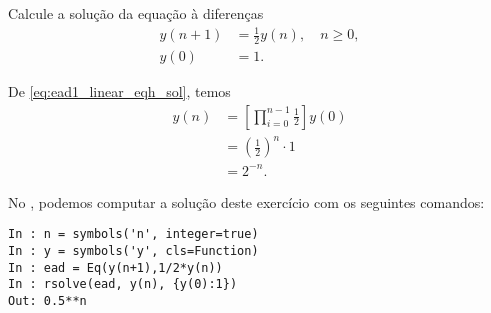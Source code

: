 \begin{exeresol}
  Calcule a solução da equação à diferenças
  \begin{align}
    y(n+1) &= \frac{1}{2}y(n),\quad n\geq 0,\\
    y(0) &= 1.
  \end{align}
\end{exeresol}
\begin{resol}
  De \eqref{eq:ead1_linear_eqh_sol}, temos
  \begin{align}
    y(n) &= \left[\prod_{i=0}^{n-1} \frac{1}{2}\right]y(0)\\
         &= \left(\frac{1}{2}\right)^{n}\cdot 1 \\
         &= 2^{-n}.
  \end{align}

  \ifispython
  No \python, podemos computar a solução deste exercício com os seguintes comandos:
\begin{verbatim}
In : n = symbols('n', integer=true)
In : y = symbols('y', cls=Function)
In : ead = Eq(y(n+1),1/2*y(n))
In : rsolve(ead, y(n), {y(0):1})
Out: 0.5**n
\end{verbatim}
  \fi
\end{resol}

